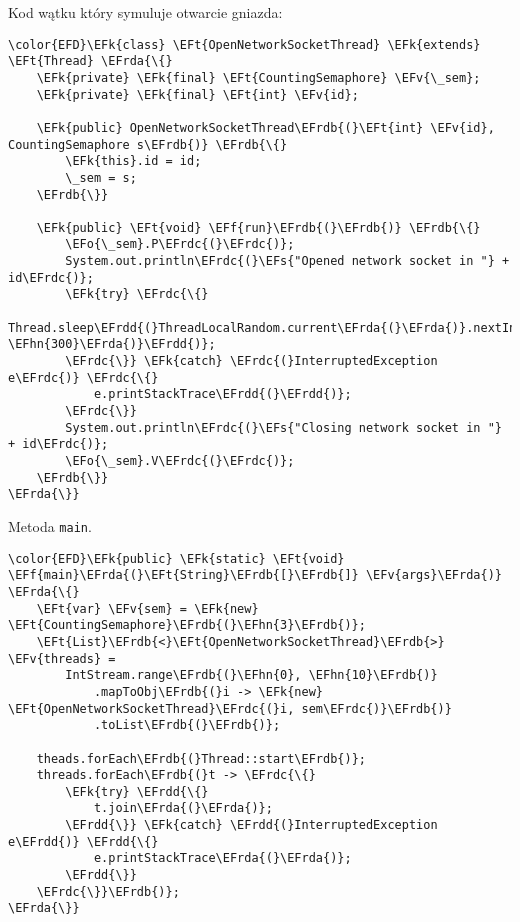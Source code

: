 \documentclass[11pt]{article}
\newcommand{\EFs}[1]{\textcolor{EFs}{#1}} %
\newcommand{\EFk}[1]{\textcolor{EFk}{#1}} %
\newcommand{\EFf}[1]{\textcolor{EFf}{#1}} %
\newcommand{\EFv}[1]{\textcolor{EFv}{#1}} %
\newcommand{\EFt}[1]{\textcolor{EFt}{#1}} %
\newcommand{\EFo}[1]{\textcolor{EFo}{#1}} %
\newcommand{\EFhn}[1]{\textcolor{EFhn}{#1}} %
\newcommand{\EFrda}[1]{#1} %
\newcommand{\EFrdb}[1]{\textcolor{EFrdb}{#1}} %
\newcommand{\EFrdc}[1]{\textcolor{EFrdc}{#1}} %
\newcommand{\EFrdd}[1]{\textcolor{EFrdd}{#1}} %
\begin{document}
Kod wątku który symuluje otwarcie gniazda:
\begin{Code}
\begin{Verbatim}
\color{EFD}\EFk{class} \EFt{OpenNetworkSocketThread} \EFk{extends} \EFt{Thread} \EFrda{\{}
    \EFk{private} \EFk{final} \EFt{CountingSemaphore} \EFv{\_sem};
    \EFk{private} \EFk{final} \EFt{int} \EFv{id};

    \EFk{public} OpenNetworkSocketThread\EFrdb{(}\EFt{int} \EFv{id}, CountingSemaphore s\EFrdb{)} \EFrdb{\{}
        \EFk{this}.id = id;
        \_sem = s;
    \EFrdb{\}}

    \EFk{public} \EFt{void} \EFf{run}\EFrdb{(}\EFrdb{)} \EFrdb{\{}
        \EFo{\_sem}.P\EFrdc{(}\EFrdc{)};
        System.out.println\EFrdc{(}\EFs{"Opened network socket in "} + id\EFrdc{)};
        \EFk{try} \EFrdc{\{}
            Thread.sleep\EFrdd{(}ThreadLocalRandom.current\EFrda{(}\EFrda{)}.nextInt\EFrda{(}\EFhn{100}, \EFhn{300}\EFrda{)}\EFrdd{)};
        \EFrdc{\}} \EFk{catch} \EFrdc{(}InterruptedException e\EFrdc{)} \EFrdc{\{}
            e.printStackTrace\EFrdd{(}\EFrdd{)};
        \EFrdc{\}}
        System.out.println\EFrdc{(}\EFs{"Closing network socket in "} + id\EFrdc{)};
        \EFo{\_sem}.V\EFrdc{(}\EFrdc{)};
    \EFrdb{\}}
\EFrda{\}}
\end{Verbatim}
\end{Code}

Metoda \texttt{main}.
\begin{Code}
\begin{Verbatim}
\color{EFD}\EFk{public} \EFk{static} \EFt{void} \EFf{main}\EFrda{(}\EFt{String}\EFrdb{[}\EFrdb{]} \EFv{args}\EFrda{)} \EFrda{\{}
    \EFt{var} \EFv{sem} = \EFk{new} \EFt{CountingSemaphore}\EFrdb{(}\EFhn{3}\EFrdb{)};
    \EFt{List}\EFrdb{<}\EFt{OpenNetworkSocketThread}\EFrdb{>} \EFv{threads} =
        IntStream.range\EFrdb{(}\EFhn{0}, \EFhn{10}\EFrdb{)}
            .mapToObj\EFrdb{(}i -> \EFk{new} \EFt{OpenNetworkSocketThread}\EFrdc{(}i, sem\EFrdc{)}\EFrdb{)}
            .toList\EFrdb{(}\EFrdb{)};

    theads.forEach\EFrdb{(}Thread::start\EFrdb{)};
    threads.forEach\EFrdb{(}t -> \EFrdc{\{}
        \EFk{try} \EFrdd{\{}
            t.join\EFrda{(}\EFrda{)};
        \EFrdd{\}} \EFk{catch} \EFrdd{(}InterruptedException e\EFrdd{)} \EFrdd{\{}
            e.printStackTrace\EFrda{(}\EFrda{)};
        \EFrdd{\}}
    \EFrdc{\}}\EFrdb{)};
\EFrda{\}}
\end{Verbatim}
\end{Code}
\end{document}

